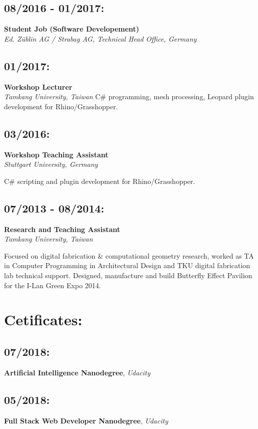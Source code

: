 \documentclass[a4paper, 9pt]{article}
\begin{document}
\subsection{08/2016 - 01/2017:}
\label{sec:orgd7a9e7c}
\textbf{Student Job (Software Developement)} \\
\emph{Ed. Züblin AG / Strabag AG, Technical Head Office, Germany}

\subsection{01/2017:}
\label{sec:org7d3f500}
\textbf{Workshop Lecturer} \\
\emph{Tamkang University, Taiwan}
C\# programming, mesh processing, Leopard plugin development for Rhino/Grasshopper.

\subsection{03/2016:}
\label{sec:org9a75887}
\textbf{Workshop Teaching Assistant} \\
\emph{Stuttgart University, Germany}

C\# scripting and plugin development for Rhino/Grasshopper.

\subsection{07/2013 - 08/2014:}
\label{sec:org31d3d34}
\textbf{Research and Teaching Assistant} \\
\emph{Tamkang University, Taiwan}

Focused on digital fabrication \& computational geometry research, 
worked as TA in Computer Programming in Architectural Design and 
TKU digital fabrication lab technical support.
Designed, manufacture and build Butterfly Effect Pavilion for the I-Lan Green Expo 2014. 



\section{Cetificates:}
\label{sec:orge8daa85}

\subsection{07/2018:}
\label{sec:org4d10b84}
\textbf{Artificial Intelligence Nanodegree}, \emph{Udacity}

\subsection{05/2018:}
\label{sec:org074fa35}
\textbf{Full Stack Web Developer Nanodegree}, \emph{Udacity}
\end{document}
